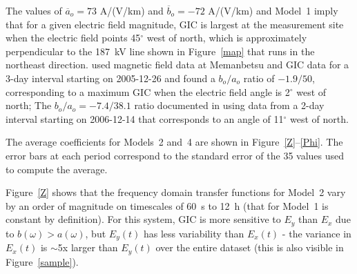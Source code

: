 \documentclass[draft,linenumbers]{agujournal2018}
\begin{document}
The values of $\overline{a}_o = 73$ A/(V/km) and $\overline{b}_o = -72$ A/(V/km) and Model~1 imply that for a given electric field magnitude, GIC is largest at the measurement site when the electric field points 45$^{\circ}$ west of north, which is approximately perpendicular to the 187~kV line shown in Figure~\ref{map} that runs in the northeast direction. \cite{Pulkkinen2010} used magnetic field data at Memanbetsu and GIC data for a 3-day interval starting on 2005-12-26 and found a $b_o/a_o$ ratio of $-1.9/50$, corresponding to a maximum GIC when the electric field angle is 2$^{\circ}$ west of north; The $b_o/a_o = -7.4/38.1$ ratio documented in \cite{Watari2015} using data from a 2-day interval starting on 2006-12-14 that corresponds to an angle of 11$^{\circ}$ west of north.



The average coefficients for Models~2 and~4 are shown in Figure~\ref{Z}--\ref{Phi}. The error bars at each period correspond to the standard error of the 35 values used to compute the average.

Figure~\ref{Z} shows that the frequency domain transfer functions for Model~2 vary by an order of magnitude on timescales of 60~s to 12~h (that for Model~1 is constant by definition). For this system, GIC is more sensitive to $E_y$ than $E_x$ due to $b(\omega) > a(\omega)$, but $E_y(t)$ has less variability than $E_x(t)$ - the variance in $E_x(t)$ is $\sim$5x larger than $E_y(t)$ over the entire dataset (this is also visible in Figure~\ref{sample}). 
\end{document}
